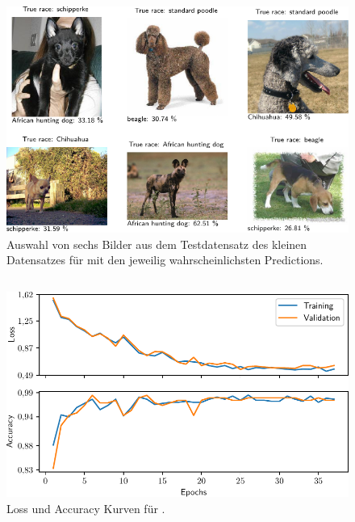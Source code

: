 
\begin{figure}
  \centering
  \includegraphics[scale=0.8]{pics/ergebnisse/MiniDogNN/visualize_predictions.pdf}
  \caption{Auswahl von sechs Bilder aus dem Testdatensatz des kleinen
  Datensatzes für \MiniDog{} mit den jeweilig wahrscheinlichsten Predictions.}
  \label{fig:visualize-pred}
\end{figure}


\subsection{\PreDog}

\begin{figure}
  \centering
  \includegraphics[scale=0.8]{pics/ergebnisse/PreDogNN/history_epoch.pdf}
  \caption{Loss und Accuracy Kurven für \PreDog{}.}
  \label{fig:loss-acc-predog}
\end{figure}

